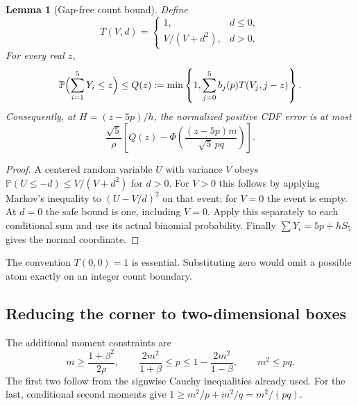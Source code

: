 \documentclass[11pt,a4paper]{article}
\newtheorem{lemma}[theorem]{Lemma}
\theoremstyle{definition}
\newcommand{\Pp}{\mathbb P}
\begin{document}
\begin{lemma}[Gap-free count bound]\label{lem:cantelli}
Define
\[
 T(V,d)=\begin{cases}1,&d\le0,\\ V/(V+d^2),&d>0.\end{cases}
\]
For every real $z$,
\begin{equation}\label{eq:count}
 \Pp\Bigl(\sum_{i=1}^5Y_i\le z\Bigr)
 \le Q(z):=\min\left\{1,\sum_{j=0}^5 b_j(p)T(V_j,j-z)\right\}.
\end{equation}
Consequently, at $H=(z-5p)/h$, the normalized positive CDF error is at most
\begin{equation}\label{eq:score}
 \frac{\sqrt5}{\rho}
 \left[Q(z)-\Phi\left(\frac{(z-5p)m}{\sqrt5\,pq}\right)\right].
\end{equation}
\end{lemma}
\begin{proof}
A centered random variable $U$ with variance $V$ obeys
$\Pp(U\le-d)\le V/(V+d^2)$ for $d>0$. For $V>0$ this follows by
applying Markov's inequality to $(U-V/d)^2$ on that event; for $V=0$
the event is empty. At $d=0$ the safe bound is one, including $V=0$.
Apply this separately to each conditional sum and use its actual binomial
probability. Finally $\sum Y_i=5p+hS_5$ gives the normal coordinate.
\end{proof}

The convention $T(0,0)=1$ is essential. Substituting zero would omit a
possible atom exactly on an integer count boundary.

\subsection{Reducing the corner to two-dimensional boxes}
The additional moment constraints are
\begin{equation}\label{eq:moments}
 m\ge\frac{1+\beta^2}{2\rho},\qquad
 \frac{2m^2}{1+\beta}\le p\le1-\frac{2m^2}{1-\beta},\qquad m^2\le pq.
\end{equation}
The first two follow from the signwise Cauchy inequalities already used.
For the last, conditional second moments give
$1\ge m^2/p+m^2/q=m^2/(pq)$.
\end{document}
